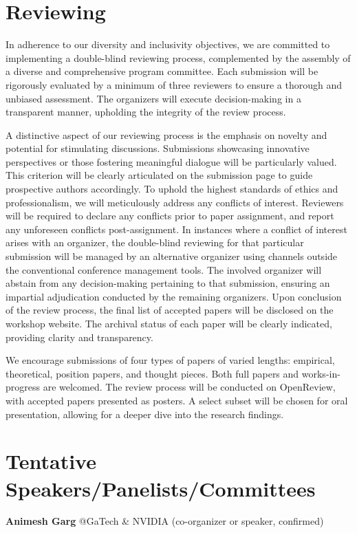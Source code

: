 \documentclass[10pt]{article} %
\begin{document}
\section{Reviewing}
In adherence to our diversity and inclusivity objectives, we are committed to implementing a double-blind reviewing process, complemented by the assembly of a diverse and comprehensive program committee. Each submission will be rigorously evaluated by a minimum of three reviewers to ensure a thorough and unbiased assessment. The organizers will execute decision-making in a transparent manner, upholding the integrity of the review process. 

A distinctive aspect of our reviewing process is the emphasis on novelty and potential for stimulating discussions. Submissions showcasing innovative perspectives or those fostering meaningful dialogue will be particularly valued. This criterion will be clearly articulated on the submission page to guide prospective authors accordingly. To uphold the highest standards of ethics and professionalism, we will meticulously address any conflicts of interest. Reviewers will be required to declare any conflicts prior to paper assignment, and report any unforeseen conflicts post-assignment. In instances where a conflict of interest arises with an organizer, the double-blind reviewing for that particular submission will be managed by an alternative organizer using channels outside the conventional conference management tools. The involved organizer will abstain from any decision-making pertaining to that submission, ensuring an impartial adjudication conducted by the remaining organizers. Upon conclusion of the review process, the final list of accepted papers will be disclosed on the workshop website. The archival status of each paper will be clearly indicated, providing clarity and transparency.

We encourage submissions of four types of papers of varied lengths: empirical, theoretical, position papers, and thought pieces. Both full papers and works-in-progress are welcomed. The review process will be conducted on OpenReview, with accepted papers presented as posters. A select subset will be chosen for oral presentation, allowing for a deeper dive into the research findings.



\section{Tentative Speakers/Panelists/Committees}
\textbf{Animesh Garg} @GaTech \& NVIDIA (co-organizer or speaker, confirmed) 
\end{document}

